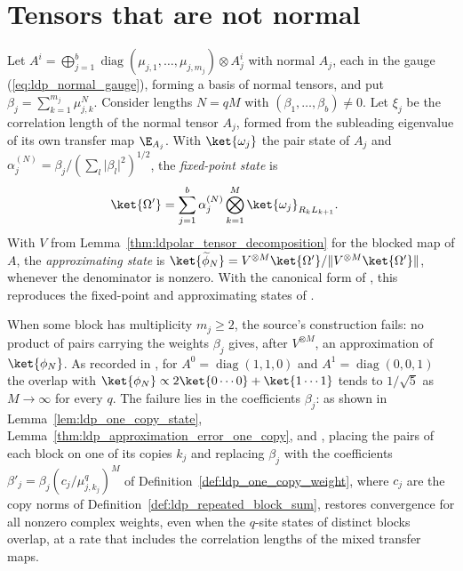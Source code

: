 \section{Tensors that are not normal}

\begin{definition}
    \label{def:ldp_non_normal_fixed_point}
    Let $A^i=\bigoplus_{j=1}^b\operatorname{diag}(\mu_{j,1},\dots,\mu_{j,m_j})
        \otimes A_j^i$ with normal $A_j$, each in the gauge
    (\ref{eq:ldp_normal_gauge}), forming a basis of normal tensors, and put
    $\beta_j=\sum_{k=1}^{m_j}\mu_{j,k}^N$. Consider lengths $N=qM$ with
    $(\beta_1,\dots,\beta_b)\neq0$. Let $\xi_j$ be the correlation length of
    the normal tensor $A_j$, formed from the subleading eigenvalue of its own
    transfer map $\E_{A_j}$. With $\ket{\omega_j}$ the pair state of $A_j$ and
    $\alpha^{(N)}_j=\beta_j/(\sum_l\lvert\beta_l\rvert^2)^{1/2}$, the
    \emph{fixed-point state} is
    \begin{align}
        \ket{\Omega'}
         & =\sum_{j=1}^b\alpha^{(N)}_j\bigotimes_{k=1}^{M}\ket{\omega_j}_{R_kL_{k+1}}.
        \label{eq:ldp_non_normal_fixed_point}
    \end{align}
    With $V$ from Lemma~\ref{thm:ldpolar_tensor_decomposition} for the blocked map of
    $A$, the \emph{approximating state} is
    $\ket{\widetilde\phi_N}=V^{\otimes M}\ket{\Omega'}/
        \lVert V^{\otimes M}\ket{\Omega'}\rVert$, whenever the denominator is
    nonzero.
    With the canonical form of \cite{Cirac2017MPDO_AnnPhys}, this reproduces the
    fixed-point and approximating states of \cite[eqs.~(19) and~(S7)]{Malz2024Preparation}.

    When some block has multiplicity $m_j\geq2$, the source's construction
    fails: no product of pairs carrying the weights $\beta_j$ gives, after
    $V^{\otimes M}$, an approximation of $\ket{\phi_N}$. As recorded in
    \cite{gap:mswc24_multiplicity_fixed_point}, for
    $A^0=\operatorname{diag}(1,1,0)$ and $A^1=\operatorname{diag}(0,0,1)$ the
    overlap with $\ket{\phi_N}\propto2\ket{0\cdots0}+\ket{1\cdots1}$ tends to
    $1/\sqrt5$ as $M\to\infty$ for every $q$. The failure lies in the
    coefficients $\beta_j$: as shown in Lemma~\ref{lem:ldp_one_copy_state},
    Lemma~\ref{thm:ldp_approximation_error_one_copy}, and
    \cite{gap:mswc24_repeated_block_corrected_state,gap:mswc24_multiplicity_fixed_point},
    placing the pairs of each block on one of its copies
    $k_j$ and replacing $\beta_j$ with the coefficients $\beta'_j=\beta_j(c_j/\mu_{j,k_j}^q)^M$ of
    Definition~\ref{def:ldp_one_copy_weight}, where $c_j$ are the copy norms of
    Definition~\ref{def:ldp_repeated_block_sum}, restores
    convergence for all nonzero complex weights, even when the
    $q$-site states of distinct blocks overlap, at a rate that includes the
    correlation lengths of the mixed transfer maps.


\end{definition}
